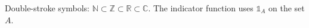 \documentclass{article}
\begin{document}
Double-stroke symbols: $\mathds{N}\subset\mathds{Z}\subset\mathds{R}\subset\mathds{C}$.
The indicator function uses $\mathds{1}_A$ on the set $A$.
\end{document}
